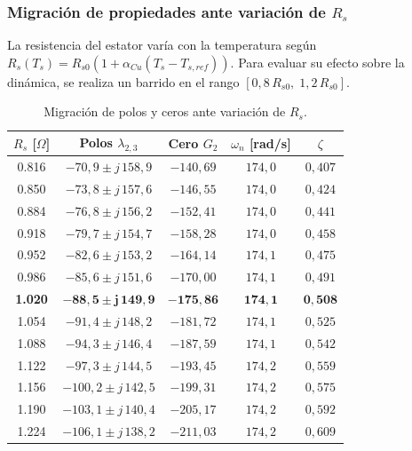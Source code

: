 \documentclass[12pt, a4paper,journal, onecolumn, compsoc]{IEEEtran}
\begin{document}
\subsubsection{Migración de propiedades ante variación de \texorpdfstring{$R_s$}{Rs}}
La resistencia del estator varía con la temperatura según $R_s(T_s) = R_{s0}(1 + \alpha_{Cu}(T_s - T_{s,ref}))$. Para evaluar su efecto sobre la dinámica, se realiza un barrido en el rango $[0{,}8\,R_{s0},\; 1{,}2\,R_{s0}]$.

\begin{table}[H]
\centering
\caption{Migración de polos y ceros ante variación de $R_s$.}
\label{tab:migracion_Rs}
\renewcommand{\arraystretch}{1.2}
\footnotesize
\begin{tabular}{|c|c|c|c|c|}
\hline
$R_s$ [$\Omega$] & Polos $\lambda_{2,3}$ & Cero $G_2$ & $\omega_n$ [rad/s] & $\zeta$ \\
\hline
0.816 & $-70{,}9 \pm j\,158{,}9$ & $-140{,}69$ & $174{,}0$ & $0{,}407$ \\
0.850 & $-73{,}8 \pm j\,157{,}6$ & $-146{,}55$ & $174{,}0$ & $0{,}424$ \\
0.884 & $-76{,}8 \pm j\,156{,}2$ & $-152{,}41$ & $174{,}0$ & $0{,}441$ \\
0.918 & $-79{,}7 \pm j\,154{,}7$ & $-158{,}28$ & $174{,}0$ & $0{,}458$ \\
0.952 & $-82{,}6 \pm j\,153{,}2$ & $-164{,}14$ & $174{,}1$ & $0{,}475$ \\
0.986 & $-85{,}6 \pm j\,151{,}6$ & $-170{,}00$ & $174{,}1$ & $0{,}491$ \\
\textbf{1.020} & $\mathbf{-88{,}5 \pm j\,149{,}9}$ & $\mathbf{-175{,}86}$ & $\mathbf{174{,}1}$ & $\mathbf{0{,}508}$ \\
1.054 & $-91{,}4 \pm j\,148{,}2$ & $-181{,}72$ & $174{,}1$ & $0{,}525$ \\
1.088 & $-94{,}3 \pm j\,146{,}4$ & $-187{,}59$ & $174{,}1$ & $0{,}542$ \\
1.122 & $-97{,}3 \pm j\,144{,}5$ & $-193{,}45$ & $174{,}2$ & $0{,}559$ \\
1.156 & $-100{,}2 \pm j\,142{,}5$ & $-199{,}31$ & $174{,}2$ & $0{,}575$ \\
1.190 & $-103{,}1 \pm j\,140{,}4$ & $-205{,}17$ & $174{,}2$ & $0{,}592$ \\
1.224 & $-106{,}1 \pm j\,138{,}2$ & $-211{,}03$ & $174{,}2$ & $0{,}609$ \\
\hline
\end{tabular}
\end{table}
\end{document}
